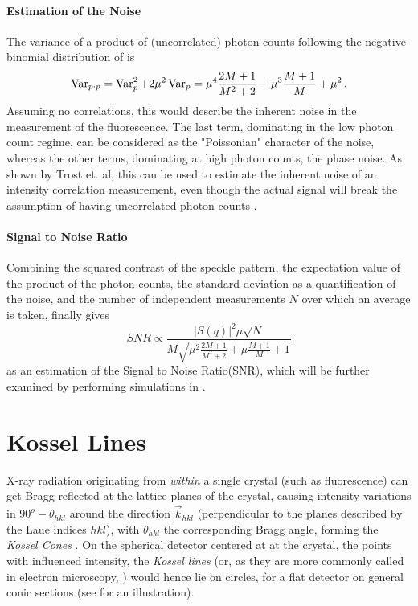 \paragraph{Estimation of the Noise}
The variance of a product of (uncorrelated) photon counts following the negative binomial distribution of  is
\begin{equation}
	\operatorname{Var}_{p\cdot p}= \operatorname{Var}_p^2 +2 \mu^2\operatorname{Var}_p	= \mu^4 \frac{2 M + 1}{M^2 + 2}+ \mu^3 \frac{M+1}{M} + \mu^2 \,.
\end{equation}
Assuming no correlations, this would describe the inherent noise in the measurement of the fluorescence. The last term, dominating in the low photon count regime, can be considered as the "Poissonian" character of the noise, whereas the other terms, dominating at high photon counts, the phase noise.
As shown by Trost et. al, this can be used to estimate the inherent noise of an intensity correlation measurement, even though the actual signal will break the assumption of having uncorrelated photon counts \cite{trost2020}.

\paragraph{Signal to Noise Ratio}
Combining the squared contrast of the speckle pattern, the expectation value of the product of the photon counts, the standard deviation as a quantification of the noise, and the number of independent measurements $N$ over which an average is taken, finally gives 
\begin{equation}
SNR\propto  \frac{|S(q)|^2 \mu\sqrt{N}}{M\sqrt{\mu^2 \frac{2 M + 1}{M^2 + 2}+ \mu \frac{M+1}{M} + 1}}
\label{eq:snr}
\end{equation}
as an estimation of the Signal to Noise Ratio(SNR), which will be further examined by performing simulations in .





\section{Kossel Lines}
\label{sec:kossel}
X-ray radiation  originating from \textit{within} a single crystal (such as fluorescence) can get Bragg reflected at the lattice planes of the crystal, causing intensity variations in $90^o-\theta_{hkl}$ around the direction $\vec{k}_{hkl}$ (perpendicular to the planes described by the Laue indices $hkl$), with $\theta_{hkl}$ the corresponding Bragg angle, forming the \textit{Kossel Cones} \cite{cowley1995}. On the spherical detector centered at at the crystal, the points with influenced intensity, the \textit{Kossel lines} (or, as they are more commonly called in electron microscopy, ) would hence lie on circles, for a flat detector on general conic sections (see  for an illustration).

